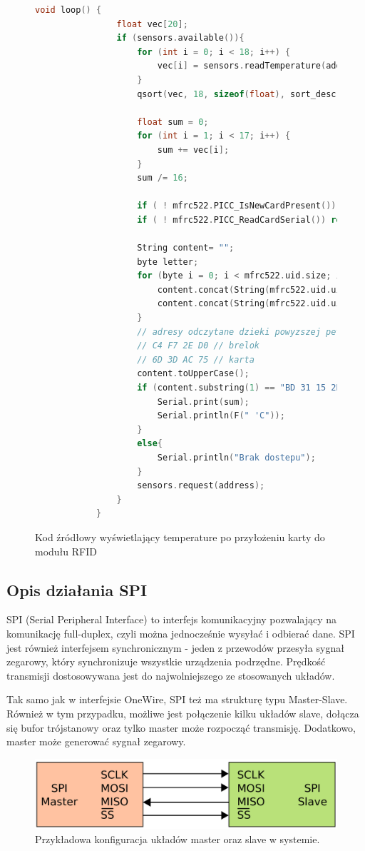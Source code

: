 \documentclass[polish,a4paper]{article}
\begin{document}
\begin{figure}[h!]
\begin{lstlisting}[language=C++, basicstyle=\tiny]
			void loop() {
				float vec[20];
				if (sensors.available()){
					for (int i = 0; i < 18; i++) {
						vec[i] = sensors.readTemperature(address);
					}
					qsort(vec, 18, sizeof(float), sort_desc);
					
					float sum = 0;
					for (int i = 1; i < 17; i++) {
						sum += vec[i];
					}
					sum /= 16;
					
					if ( ! mfrc522.PICC_IsNewCardPresent()) return;
					if ( ! mfrc522.PICC_ReadCardSerial()) return;
					
					String content= "";
					byte letter;
					for (byte i = 0; i < mfrc522.uid.size; i++){
						content.concat(String(mfrc522.uid.uidByte[i] < 0x10 ? " 0" : " "));
						content.concat(String(mfrc522.uid.uidByte[i], HEX));
					}
					// adresy odczytane dzieki powyzszej petli:
					// C4 F7 2E D0 // brelok
					// 6D 3D AC 75 // karta
					content.toUpperCase();
					if (content.substring(1) == "BD 31 15 2B"){
						Serial.print(sum);
						Serial.println(F(" 'C"));
					}
					else{
						Serial.println("Brak dostepu");
					}
					sensors.request(address);
				}
			}
		\end{lstlisting}
		\caption*{Kod źródłowy wyświetlający temperature po przyłożeniu karty do modułu RFID}
	\end{figure}
	\newpage
	\subsection{Opis działania SPI}
	SPI (Serial Peripheral Interface) to interfejs komunikacyjny pozwalający na komunikację full-duplex, czyli można jednocześnie wysyłać i odbierać dane. SPI jest również interfejsem synchronicznym - jeden z przewodów przesyła sygnał zegarowy, który synchronizuje wszystkie urządzenia podrzędne. Prędkość transmisji dostosowywana jest do najwolniejszego ze stosowanych układów. 
	
	Tak samo jak w interfejsie OneWire, SPI też ma strukturę typu Master-Slave. Również w tym przypadku, możliwe jest połączenie kilku układów slave, dołącza się bufor trójstanowy oraz tylko master może rozpocząć transmisję. Dodatkowo, master może generować sygnał zegarowy.
	
	\begin{figure}[h!]
		\begin{center}
			\includegraphics[scale=0.2]{SPI.png}
			\caption*{Przykładowa konfiguracja układów master oraz slave w systemie.}
		\end{center}
	\end{figure}
	
\end{document}
